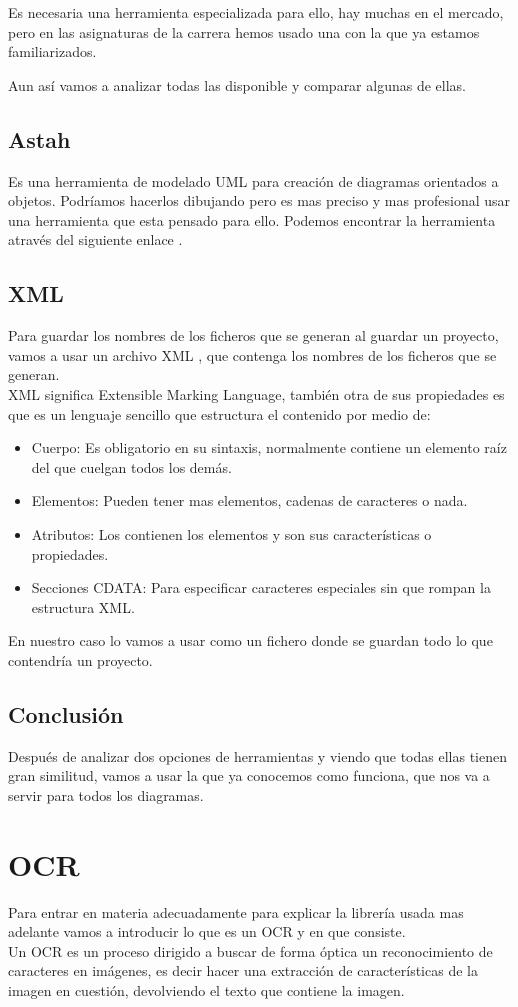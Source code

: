 Es necesaria una herramienta especializada para ello, hay muchas en el mercado, pero en las asignaturas de la carrera hemos usado una con la que ya estamos familiarizados.

Aun así vamos a analizar todas las disponible y comparar algunas de ellas.


\subsection{Astah}
Es una herramienta de modelado UML para creación de diagramas orientados a objetos.
Podríamos hacerlos dibujando pero es mas preciso y mas profesional usar una herramienta que esta pensado para ello.
Podemos encontrar la herramienta através del siguiente enlace  \cite{http://astah.net/}.

\subsection{XML}
Para guardar los nombres de los ficheros que se generan al guardar un proyecto, vamos a usar un archivo XML \cite{Wiki:xml}, que contenga los nombres de los ficheros que se generan.\\
XML significa Extensible Marking Language, también otra de sus propiedades es que es un lenguaje sencillo que estructura el contenido por medio de:
\begin{itemize}
\item Cuerpo: Es obligatorio en su sintaxis, normalmente contiene un elemento raíz del que cuelgan todos los demás.
\item Elementos: Pueden tener mas elementos, cadenas de caracteres o nada.
\item Atributos: Los contienen los elementos y son sus características o propiedades.
\item Secciones CDATA: Para especificar caracteres especiales sin que rompan la estructura XML.
\end{itemize}
 

En nuestro caso lo vamos a usar como un fichero donde se guardan todo lo que contendría un proyecto.
\subsection{Conclusión}
Después de analizar dos opciones de herramientas y viendo que todas ellas tienen gran similitud, vamos a usar la que ya conocemos como funciona, que nos va a servir para todos los diagramas.

\section{OCR}
Para entrar en materia adecuadamente para explicar la librería usada mas adelante vamos a introducir lo que es un OCR  \cite{OCR} y en que consiste.\\
Un OCR es un proceso dirigido a buscar de forma óptica un reconocimiento de caracteres en imágenes, es decir hacer una extracción de características de la imagen en cuestión, devolviendo el texto que contiene la imagen.

